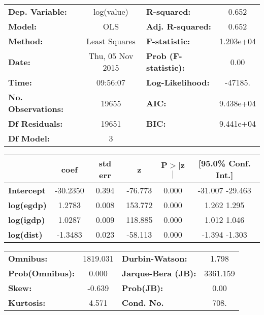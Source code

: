 \begin{center}
\begin{tabular}{lclc}
\toprule
\textbf{Dep. Variable:}    &    log(value)    & \textbf{  R-squared:         } &     0.652   \\
\textbf{Model:}            &       OLS        & \textbf{  Adj. R-squared:    } &     0.652   \\
\textbf{Method:}           &  Least Squares   & \textbf{  F-statistic:       } & 1.203e+04   \\
\textbf{Date:}             & Thu, 05 Nov 2015 & \textbf{  Prob (F-statistic):} &     0.00    \\
\textbf{Time:}             &     09:56:07     & \textbf{  Log-Likelihood:    } &   -47185.   \\
\textbf{No. Observations:} &       19655      & \textbf{  AIC:               } & 9.438e+04   \\
\textbf{Df Residuals:}     &       19651      & \textbf{  BIC:               } & 9.441e+04   \\
\textbf{Df Model:}         &           3      & \textbf{                     } &             \\
\bottomrule
\end{tabular}
\begin{tabular}{lccccc}
                   & \textbf{coef} & \textbf{std err} & \textbf{z} & \textbf{P$>$$|$z$|$} & \textbf{[95.0\% Conf. Int.]}  \\
\midrule
\textbf{Intercept} &     -30.2350  &        0.394     &   -76.773  &         0.000        &       -31.007   -29.463       \\
\textbf{log(egdp)} &       1.2783  &        0.008     &   153.772  &         0.000        &         1.262     1.295       \\
\textbf{log(igdp)} &       1.0287  &        0.009     &   118.885  &         0.000        &         1.012     1.046       \\
\textbf{log(dist)} &      -1.3483  &        0.023     &   -58.113  &         0.000        &        -1.394    -1.303       \\
\bottomrule
\end{tabular}
\begin{tabular}{lclc}
\textbf{Omnibus:}       & 1819.031 & \textbf{  Durbin-Watson:     } &    1.798  \\
\textbf{Prob(Omnibus):} &   0.000  & \textbf{  Jarque-Bera (JB):  } & 3361.159  \\
\textbf{Skew:}          &  -0.639  & \textbf{  Prob(JB):          } &     0.00  \\
\textbf{Kurtosis:}      &   4.571  & \textbf{  Cond. No.          } &     708.  \\
\bottomrule
\end{tabular}
\end{center}